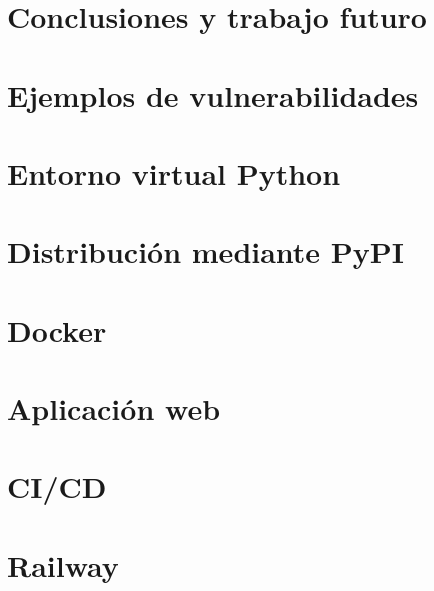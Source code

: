 \documentclass[11pt,a4paper,spanish]{book}
\numberwithin{equation}{chapter}
\numberwithin{figure}{chapter}
\begin{document}
\chapter{Conclusiones y trabajo futuro}





\appendix

\chapter{Ejemplos de vulnerabilidades}


\chapter{Entorno virtual Python}


\chapter{Distribución mediante PyPI}


\chapter{Docker}


\chapter{Aplicación web}


\chapter{CI/CD}


\chapter{Railway}

\end{document}
